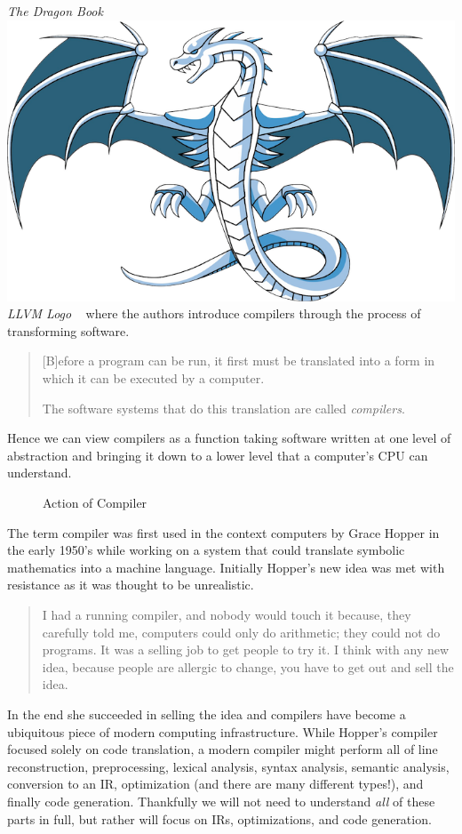 {    \emph{The Dragon Book}
    \includegraphics[width=\marginparwidth]{img/llvmlogo.png}
    \emph{LLVM Logo}
}~\cite{dragonbook} where the authors introduce compilers through the process of transforming software.
\begin{quotation}
    [B]efore a program can be run, it first must be translated into a form in which it can be executed by a computer.

    The software systems that do this translation are called \emph{compilers}.
\end{quotation}
Hence we can view compilers as a function taking software written at one level of abstraction and bringing it down to a lower level that a computer's \ac{CPU} can understand.
\begin{figure}[ht]
    \centering
    
    \caption{Action of Compiler}\label{fig:compiler}
\end{figure}

The term compiler was first used in the context computers by Grace Hopper in the early 1950's while working on a system that could translate symbolic mathematics into a machine language.
Initially Hopper's new idea was met with resistance as it was thought to be unrealistic.
\begin{quotation}
    I had a running compiler, and nobody would touch it because, they carefully told me, computers could only do arithmetic; they could not do programs.
    It was a selling job to get people to try it.
    I think with any new idea, because people are allergic to change, you have to get out and sell the idea.
\end{quotation}
In the end she succeeded in selling the idea and compilers have become a ubiquitous piece of modern computing infrastructure.
While Hopper's compiler focused solely on code translation, a modern compiler might perform all of line reconstruction, preprocessing, lexical analysis, syntax analysis, semantic analysis, conversion to an \ac{IR}, optimization (and there are many different types!), and finally code generation.
Thankfully we will not need to understand \emph{all} of these parts in full, but rather will focus on \aclp{IR}, optimizations, and code generation.

